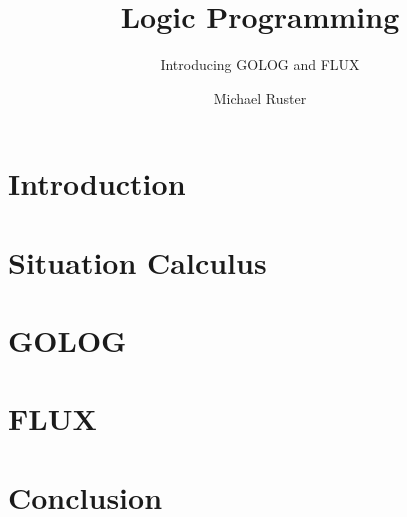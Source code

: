 \documentclass{../template/llncs}
\title{Logic Programming}
\subtitle{Introducing GOLOG and FLUX}
\author{Michael Ruster}
\institute{University Koblenz-Landau}
\begin{document}
\maketitle

\section{Introduction}


\section{Situation Calculus}\label{sitCalc}


\section{GOLOG}\label{golog}


\section{FLUX}\label{flux}


\section{Conclusion}\label{conclusion}



\clearpage

\end{document}
